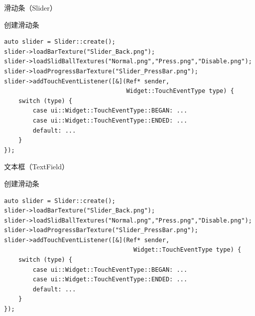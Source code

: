 \documentclass{beamer}
\begin{document}

\begin{frame}[fragile]{滑动条（Slider）}
\begin{block}{创建滑动条}
\begin{verbatim}
auto slider = Slider::create();
slider->loadBarTexture("Slider_Back.png");
slider->loadSlidBallTextures("Normal.png","Press.png","Disable.png");
slider->loadProgressBarTexture("Slider_PressBar.png");
slider->addTouchEventListener([&](Ref* sender,
                                  Widget::TouchEventType type) {
    switch (type) {
        case ui::Widget::TouchEventType::BEGAN: ...
        case ui::Widget::TouchEventType::ENDED: ...
        default: ...
    }
});
\end{verbatim}
\end{block}
\end{frame}


\begin{frame}[fragile]{文本框（TextField）}
\begin{block}{创建滑动条}
\begin{verbatim}
auto slider = Slider::create();
slider->loadBarTexture("Slider_Back.png");
slider->loadSlidBallTextures("Normal.png","Press.png","Disable.png");
slider->loadProgressBarTexture("Slider_PressBar.png");
slider->addTouchEventListener([&](Ref* sender,
                                    Widget::TouchEventType type) {
    switch (type) {
        case ui::Widget::TouchEventType::BEGAN: ...
        case ui::Widget::TouchEventType::ENDED: ...
        default: ...
    }
});
\end{verbatim}
\end{block}
\end{frame}





\backmatter
\end{document}
